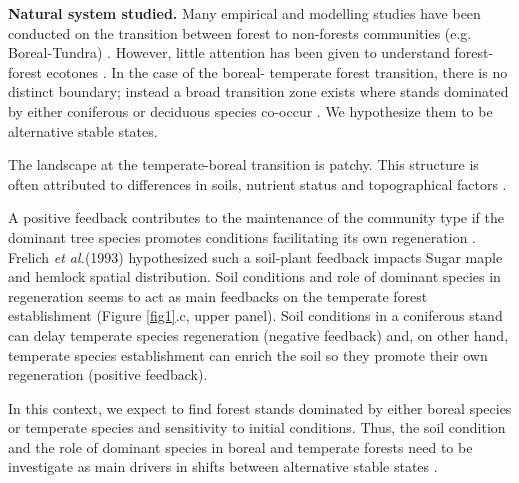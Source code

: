 \textbf{Natural system studied.} Many empirical and modelling studies have
been conducted on the transition between forest to non-forests communities
(e.g. Boreal-Tundra) \cite{Scheffer2012,Scheffer2001,Hirota2011,Messaoud2007}.
However, little attention has been given to understand forest-forest ecotones
\cite{Goldblum2010,Graignic2013,Messaoud2007}. In the case of the boreal-
temperate forest transition, there is no distinct boundary; instead a broad transition
zone exists where stands dominated by either coniferous or deciduous species co-occur
\cite{Goldblum2010,Fisichelli2013}. We hypothesize them to be alternative stable states.

The landscape at the temperate-boreal
transition is patchy. This structure is often attributed to
differences in soils, nutrient status and topographical factors
\cite{Society2014}.

A positive feedback contributes to the maintenance of the community type if
the dominant tree species promotes conditions facilitating its own
regeneration \cite{Barras1998}. Frelich \textit{et al.}(1993)
\cite{Society2014} hypothesized such a soil-plant feedback impacts Sugar maple
and hemlock spatial distribution. Soil conditions and role of dominant
species in regeneration seems to act as main feedbacks on the temperate forest
establishment (Figure \ref{fig1}.c, upper panel).
Soil conditions in a coniferous stand can delay
temperate species regeneration (negative feedback) 
and, on other hand,
temperate species establishment can enrich the soil so they promote their own
regeneration (positive feedback).


In this context, we expect to find forest stands dominated by either boreal
species or temperate species and sensitivity to initial conditions. Thus, the
soil condition and the role of dominant species in boreal and temperate
forests need to be investigate as main drivers in shifts between alternative
stable states \cite{Kellman2004,Moore2008,DeFrenne2013,Barras1998}.


